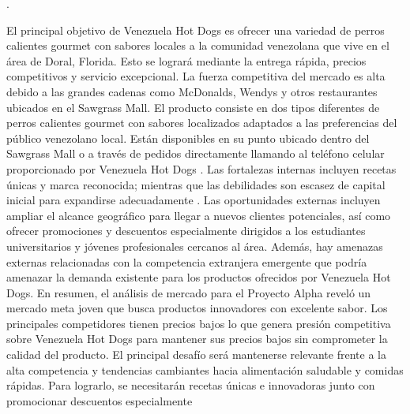 .

El principal objetivo de Venezuela Hot Dogs es ofrecer una variedad de perros calientes gourmet con sabores locales a la comunidad venezolana que vive en el área de Doral, Florida. Esto se logrará mediante la entrega rápida, precios competitivos y servicio excepcional. La fuerza competitiva del mercado es alta debido a las grandes cadenas como McDonalds, Wendys y otros restaurantes ubicados en el Sawgrass Mall. El producto consiste en dos tipos diferentes de perros calientes gourmet con sabores localizados adaptados a las preferencias del público venezolano local. Están disponibles en su punto ubicado dentro del Sawgrass Mall o a través de pedidos directamente llamando al teléfono celular proporcionado por Venezuela Hot Dogs . Las fortalezas internas incluyen recetas únicas y marca reconocida; mientras que las debilidades son escasez de capital inicial para expandirse adecuadamente . 
Las oportunidades externas incluyen ampliar el alcance geográfico para llegar a nuevos clientes potenciales, así como ofrecer promociones y descuentos especialmente dirigidos a los estudiantes universitarios y jóvenes profesionales cercanos al área. Además, hay amenazas externas relacionadas con la competencia extranjera emergente que podría amenazar la demanda existente para los productos ofrecidos por Venezuela Hot Dogs. 
En resumen, el análisis de mercado para el Proyecto Alpha reveló un mercado meta joven que busca productos innovadores con excelente sabor. Los principales competidores tienen precios bajos lo que genera presión competitiva sobre Venezuela Hot Dogs para mantener sus precios bajos sin comprometer la calidad del producto. El principal desafío será mantenerse relevante frente a la alta competencia y tendencias cambiantes hacia alimentación saludable y comidas rápidas. Para lograrlo, se necesitarán recetas únicas e innovadoras junto con promocionar descuentos especialmente